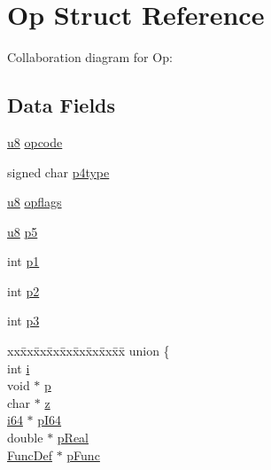 \hypertarget{struct_vdbe_op}{}\section{Op Struct Reference}
\label{struct_vdbe_op}


Collaboration diagram for Op\+:
\subsection*{Data Fields}
\begin{DoxyCompactItemize}
\item 
\hyperlink{sqlite3_8c_a74a0f6424ae628af25f23f0a35f6ead3}{u8} \hyperlink{struct_vdbe_op_a2edfbd2b9bfd9c14b79dd26ffd02d88f}{opcode}
\item 
signed char \hyperlink{struct_vdbe_op_af515c435102c9e6e4002058086090e59}{p4type}
\item 
\hyperlink{sqlite3_8c_a74a0f6424ae628af25f23f0a35f6ead3}{u8} \hyperlink{struct_vdbe_op_a42aec056f204bee9135be56eba3bf4ec}{opflags}
\item 
\hyperlink{sqlite3_8c_a74a0f6424ae628af25f23f0a35f6ead3}{u8} \hyperlink{struct_vdbe_op_a8308037057f2acf587d898607ed08fd6}{p5}
\item 
int \hyperlink{struct_vdbe_op_a8d5504470de9fec69f0389092910c500}{p1}
\item 
int \hyperlink{struct_vdbe_op_a2fbbf5056a49832e7d5e73a15ae2ee05}{p2}
\item 
int \hyperlink{struct_vdbe_op_a72edc878cdc5f05f4217ec6330dc549c}{p3}
\item 
\begin{tabbing}
xx\=xx\=xx\=xx\=xx\=xx\=xx\=xx\=xx\=\kill
union \{\\
\>int \hyperlink{struct_vdbe_op_acb559820d9ca11295b4500f179ef6392}{i}\\
\>void $\ast$ \hyperlink{struct_vdbe_op_a117104b82864d3b23ec174af6d392709}{p}\\
\>char $\ast$ \hyperlink{struct_vdbe_op_a99c0cc44b073a87d419d090571f773a5}{z}\\
\>\hyperlink{sqlite3_8c_a2a0f0f4ae7001eb54351f77ea1cdbcfd}{i64} $\ast$ \hyperlink{struct_vdbe_op_a1876426c76d65956460aaabcf0a96d8c}{pI64}\\
\>double $\ast$ \hyperlink{struct_vdbe_op_a4e34f091839ab042cf1d4ff2195a6b86}{pReal}\\
\>\hyperlink{struct_func_def}{FuncDef} $\ast$ \hyperlink{struct_vdbe_op_a3859b9ebe9b2002c8ffb62f1a52e5c4d}{pFunc}\\

\end{tabbing}
\end{DoxyCompactItemize}
